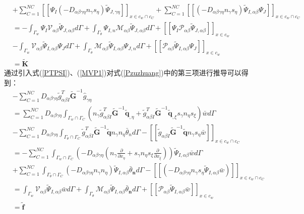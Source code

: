 \begin{equation}
\begin{split}
    &+\sum_{C=1}^{N\!C}[[\Psi_I(-D_{\alpha\beta\gamma\eta}n_{\gamma}s_{\eta})\tilde{\Psi}_{J,\gamma\eta}]]_{x\in{c_w}\cap{c_C}}+\sum_{C=1}^{N\!C}[[(-D_{\alpha\beta\gamma\eta}n_{\gamma}s_{\eta})\tilde{\Psi}_{I,\alpha\beta}\Psi_J]]_{x\in{c_w}\cap{c_C}}\\
    &=-\int_{\Gamma_w}\Psi_I\mathcal{V}_{\alpha\beta}\tilde{\Psi}_{J,\alpha\beta}d\Gamma+\int_{\Gamma_{\theta}}\Psi_{I,n}\mathcal{M}_{\alpha\beta}\tilde{\Psi}_{J,\alpha\beta}d\Gamma+[[\Psi_I\mathcal{P}_{\alpha\beta}\tilde{\Psi}_{J,\alpha\beta}]]_{x\in{c_w}}\\
    &-\int_{\Gamma_w}\mathcal{V}_{\alpha\beta}\tilde{\Psi}_{I,\alpha\beta}\Psi_Jd\Gamma+\int_{\Gamma_{\theta}}\mathcal{M}_{\alpha\beta}\tilde{\Psi}_{I,\alpha\beta}\Psi_{J,n}d\Gamma+[[\mathcal{P}_{\alpha\beta}\tilde{\Psi}_{I,\alpha\beta}\Psi_J]]_{x\in{c_w}}\\
    &=\tilde{\pmb K}
\end{split}
\end{equation}
\newpage
通过引入式(\ref{PTPSI})、(\ref{MVP1})对式(\ref{Pzuzhuang})中的第三项进行推导可以得到：
\begin{equation}
\begin{split}
    &-\sum_{C=1}^{N\!C}D_{\alpha\beta\gamma\eta}\tilde{g}^T_{\alpha\beta I}\tilde{\pmb G}^{-1}\hat{g}_{\gamma\eta}\\
    &=\sum_{C=1}^{N\!C}D_{\alpha\beta\gamma\eta}\int_{{\Gamma_w}\cap{\Gamma_C}}(n_{\gamma}
    \tilde{g}_{\alpha\beta I}^T\tilde{\pmb G}^{-1}\tilde{\pmb q}_{,\eta}+\tilde{g}_{\alpha\beta I}^T
    \tilde{\pmb G}^{-1}\tilde{\pmb q}_{,\xi}s_{\gamma}n_{\eta}s_{\xi})\bar{w}d\Gamma\\
    &-\sum_{C=1}^{N\!C}D_{\alpha\beta\gamma\eta}\int_{{\Gamma_{\theta}}\cap{\Gamma_{C}}}\tilde{g}^T_{\alpha\beta I}\tilde{\pmb G}^{-1}\tilde{\pmb q}n_{\gamma}n_{\eta}\bar{\theta}_nd\Gamma-[[\tilde{g}_{\alpha\beta I}\tilde{\pmb G}^{-1}\tilde{\pmb q}n_{\gamma}s_{\eta}\bar{w}]]_{x\in{c_w}\cap{c_C}}\\
    &=-\sum_{C=1}^{N\!C}\int_{{\Gamma_w}\cap{\Gamma_C}}(-D_{\alpha\beta\gamma\eta}(n_{\gamma}\frac{\partial}{\partial x_{\eta}}+s_{\gamma}n_{\eta}s_{\xi}\frac{\partial}{\partial x_{\xi}}))\tilde{\Psi}_{I,\alpha\beta}\bar{w}d\Gamma\\
    &+\sum_{C=1}^{N\!C}\int_{{\Gamma_{\theta}}\cap{\Gamma_C}}(-D_{\alpha\beta\gamma\eta}n_{\gamma}n_{\eta})\tilde{\Psi}_{I,\alpha\beta}\bar{\theta}_{\pmb n}d\Gamma-[[(-D_{\alpha\beta\gamma\eta}n_{\gamma}s_{\eta}\tilde{\Psi}_{I,\alpha\beta}\bar{w})]]_{x\in{c_w}\cap{c_C}}\\
    &=\int_{\Gamma_w}\mathcal{V}_{\alpha\beta}\tilde{\Psi}_{I,\alpha\beta}\bar{w}d\Gamma+\int_{\Gamma_{\theta}}\mathcal{M}_{\alpha\beta}\tilde{\Psi}_{I,\alpha\beta}\bar{\theta}_{\pmb n}d\Gamma+[[\mathcal{P}_{\alpha\beta}\tilde{\Psi}_{I,\alpha\beta}\bar{w}]]_{x\in{c_w}}\\
    &=\tilde{\pmb f}
\end{split}
\end{equation}
